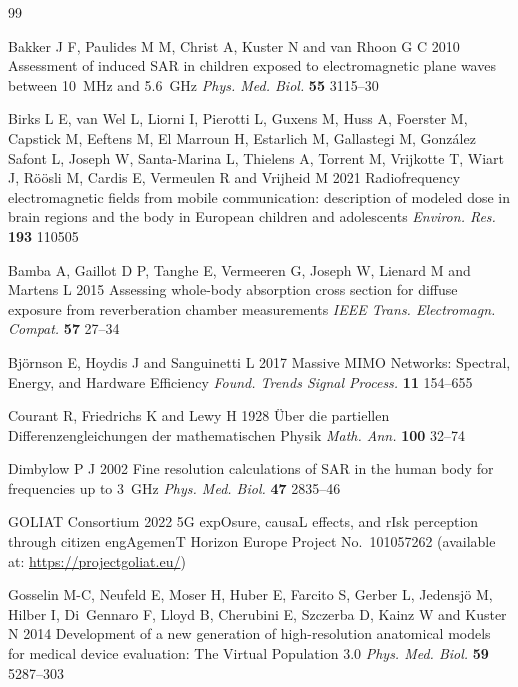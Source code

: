 \documentclass{iopjournal}
\begin{document}
\begin{thebibliography}{99}

Bakker J F, Paulides M M, Christ A, Kuster N and van Rhoon G C 2010 Assessment of induced SAR in children exposed to electromagnetic plane waves between 10~MHz and 5.6~GHz \emph{Phys. Med. Biol.} \textbf{55} 3115--30

Birks L E, van Wel L, Liorni I, Pierotti L, Guxens M, Huss A, Foerster M, Capstick M, Eeftens M, El Marroun H, Estarlich M, Gallastegi M, Gonz\'{a}lez Safont L, Joseph W, Santa-Marina L, Thielens A, Torrent M, Vrijkotte T, Wiart J, R\"{o}\"{o}sli M, Cardis E, Vermeulen R and Vrijheid M 2021 Radiofrequency electromagnetic fields from mobile communication: description of modeled dose in brain regions and the body in European children and adolescents \emph{Environ. Res.} \textbf{193} 110505

Bamba A, Gaillot D P, Tanghe E, Vermeeren G, Joseph W, Lienard M and Martens L 2015 Assessing whole-body absorption cross section for diffuse exposure from reverberation chamber measurements \emph{IEEE Trans. Electromagn. Compat.} \textbf{57} 27--34

Bj{\"o}rnson E, Hoydis J and Sanguinetti L 2017 Massive MIMO Networks: Spectral, Energy, and Hardware Efficiency \emph{Found. Trends Signal Process.} \textbf{11} 154--655

Courant R, Friedrichs K and Lewy H 1928 {\"U}ber die partiellen Differenzengleichungen der mathematischen Physik \emph{Math. Ann.} \textbf{100} 32--74

Dimbylow P J 2002 Fine resolution calculations of SAR in the human body for frequencies up to 3~GHz \emph{Phys. Med. Biol.} \textbf{47} 2835--46


GOLIAT Consortium 2022 5G expOsure, causaL effects, and rIsk perception through citizen engAgemenT Horizon Europe Project No.~101057262 (available at: \url{https://projectgoliat.eu/})

Gosselin M-C, Neufeld E, Moser H, Huber E, Farcito S, Gerber L, Jedensj{\"o} M, Hilber I, Di~Gennaro F, Lloyd B, Cherubini E, Szczerba D, Kainz W and Kuster N 2014 Development of a new generation of high-resolution anatomical models for medical device evaluation: The Virtual Population 3.0 \emph{Phys. Med. Biol.} \textbf{59} 5287--303


\end{thebibliography}
\end{document}
